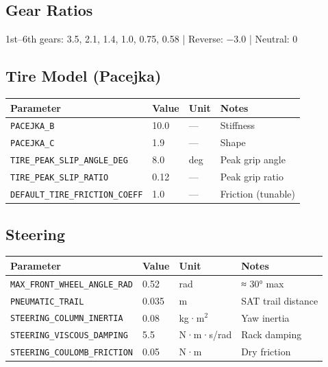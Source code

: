 \subsection{Gear Ratios}

1st–6th gears: 3.5, 2.1, 1.4, 1.0, 0.75, 0.58 | Reverse: −3.0 | Neutral: 0

\subsection{Tire Model (Pacejka)}

\begin{table}[h]
  \centering
  \small
  \begin{tabular}{llll}
    \toprule
    \textbf{Parameter} & \textbf{Value} & \textbf{Unit} & \textbf{Notes} \\
    \midrule
    \texttt{PACEJKA\_B} & 10.0 & — & Stiffness \\
    \texttt{PACEJKA\_C} & 1.9 & — & Shape \\
    \texttt{TIRE\_PEAK\_SLIP\_ANGLE\_DEG} & 8.0 & deg & Peak grip angle \\
    \texttt{TIRE\_PEAK\_SLIP\_RATIO} & 0.12 & — & Peak grip ratio \\
    \texttt{DEFAULT\_TIRE\_FRICTION\_COEFF} & 1.0 & — & Friction (tunable) \\
    \bottomrule
  \end{tabular}
\end{table}

\subsection{Steering}

\begin{table}[h]
  \centering
  \small
  \begin{tabular}{llll}
    \toprule
    \textbf{Parameter} & \textbf{Value} & \textbf{Unit} & \textbf{Notes} \\
    \midrule
    \texttt{MAX\_FRONT\_WHEEL\_ANGLE\_RAD} & 0.52 & rad & ≈ 30° max \\
    \texttt{PNEUMATIC\_TRAIL} & 0.035 & m & SAT trail distance \\
    \texttt{STEERING\_COLUMN\_INERTIA} & 0.08 & kg·m$^2$ & Yaw inertia \\
    \texttt{STEERING\_VISCOUS\_DAMPING} & 5.5 & N·m·s/rad & Rack damping \\
    \texttt{STEERING\_COULOMB\_FRICTION} & 0.05 & N·m & Dry friction \\
    \bottomrule
  \end{tabular}
\end{table}

